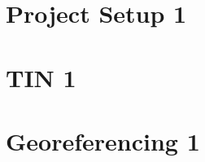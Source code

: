 \documentclass{scrartcl}
\begin{document}
\section{Project Setup 1}
\label{sec:project_setup_1}

\section{TIN 1}
\label{sec:tin_1}

\section{Georeferencing 1}
\label{sec:georeferencing_1}
\end{document}
